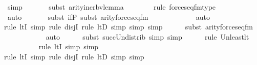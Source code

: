 \begin{isabellebody}
\ simp\ \isanewline
\ \ \ \ \ \isamarkupfalse%
{\isacharparenleft}{\kern0pt}subst\ arity{\isacharunderscore}{\kern0pt}incr{\isacharunderscore}{\kern0pt}bv{\isacharunderscore}{\kern0pt}lemma{\isacharparenright}{\kern0pt}\isanewline
\ \ \ \ \ \ \ \isamarkupfalse%
{\isacharparenleft}{\kern0pt}rule\ forces{\isacharunderscore}{\kern0pt}eq{\isacharunderscore}{\kern0pt}fm{\isacharunderscore}{\kern0pt}type{\isacharparenright}{\kern0pt}\isanewline
\ \ \ \ \ \ \ \ \ \ \ \isamarkupfalse%
\ auto{\isacharbrackleft}{\kern0pt}{}{\isacharbrackright}{\kern0pt}\isanewline
\ \ \ \ \ \isamarkupfalse%
\ {\isacharparenleft}{\kern0pt}subst\ if{\isacharunderscore}{\kern0pt}P{\isacharcomma}{\kern0pt}\ subst\ arity{\isacharunderscore}{\kern0pt}forces{\isacharunderscore}{\kern0pt}eq{\isacharunderscore}{\kern0pt}fm{\isacharparenright}{\kern0pt}\isanewline
\ \ \ \ \ \ \ \ \ \ \ \isamarkupfalse%
\ auto{\isacharbrackleft}{\kern0pt}{}{\isacharbrackright}{\kern0pt}\isanewline
\ \ \ \ \ \ \isamarkupfalse%
{\isacharparenleft}{\kern0pt}rule\ ltI{\isacharcomma}{\kern0pt}\ simp{\isacharcomma}{\kern0pt}\ rule\ disjI{}{\isacharcomma}{\kern0pt}\ rule\ ltD{\isacharcomma}{\kern0pt}\ simp{\isacharcomma}{\kern0pt}\ simp{\isacharcomma}{\kern0pt}\ simp{\isacharparenright}{\kern0pt}\isanewline
\ \ \ \ \ \isamarkupfalse%
{\isacharparenleft}{\kern0pt}subst\ arity{\isacharunderscore}{\kern0pt}forces{\isacharunderscore}{\kern0pt}eq{\isacharunderscore}{\kern0pt}fm{\isacharparenright}{\kern0pt}\isanewline
\ \ \ \ \ \ \ \ \ \ \isamarkupfalse%
\ auto{\isacharbrackleft}{\kern0pt}{}{\isacharbrackright}{\kern0pt}\isanewline
\ \ \ \ \ \isamarkupfalse%
{\isacharparenleft}{\kern0pt}subst\ succ{\isacharunderscore}{\kern0pt}Un{\isacharunderscore}{\kern0pt}distrib{\isacharcomma}{\kern0pt}\ simp{\isacharcomma}{\kern0pt}\ simp{\isacharparenright}{\kern0pt}{\isacharplus}{\kern0pt}\isanewline
\ \ \ \ \ \isamarkupfalse%
{\isacharparenleft}{\kern0pt}rule\ Un{\isacharunderscore}{\kern0pt}least{\isacharunderscore}{\kern0pt}lt{\isacharparenright}{\kern0pt}{\isacharplus}{\kern0pt}\isanewline
\ \ \ \ \ \ \ \ \ \isamarkupfalse%
{\isacharparenleft}{\kern0pt}rule\ ltI{\isacharcomma}{\kern0pt}\ simp{\isacharcomma}{\kern0pt}\ simp{\isacharparenright}{\kern0pt}{\isacharplus}{\kern0pt}\isanewline
\ \ \ \ \ \ \isamarkupfalse%
{\isacharparenleft}{\kern0pt}rule\ ltI{\isacharcomma}{\kern0pt}\ simp{\isacharcomma}{\kern0pt}\ rule\ disjI{}{\isacharcomma}{\kern0pt}\ rule\ ltD{\isacharcomma}{\kern0pt}\ simp{\isacharcomma}{\kern0pt}\ simp{\isacharparenright}{\kern0pt}{\isacharplus}{\kern0pt}\isanewline

\end{isabellebody}
